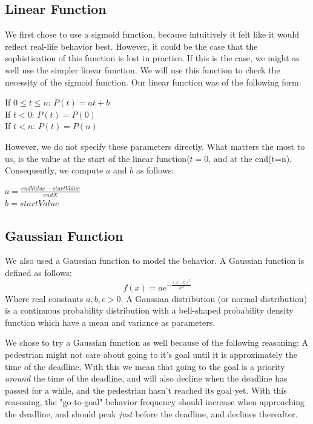 \documentclass[11pt]{book}
\begin{document}
\subsection{Linear Function}
We first chose to use a sigmoid function, because intuitively it felt like it would reflect real-life behavior best. However, it could be the case that the sophistication of this function is lost in practice. If this is the case, we might as well use the simpler linear function. We will use this function to check the necessity of the sigmoid function. Our linear function was of the following form:
\begin{center}
If $0 \leq t \leq n$: $P(t) = at + b$\\
If $t<0$: $P(t) = P(0)$\\
If $t<n$: $P(t) = P(n)$
\end{center}
However, we do not specify these parameters directly. What matters the most to us, is the value at the start of the linear function($t=0$, and at the end(t=n). Consequently, we compute $a$ and $b$ as follows:
\begin{center}
$a = \frac{endValue - startValue}{endX}$\\
$b = startValue$
\end{center}



\subsection{Gaussian Function}
We also used a Gaussian function to model the behavior. A Gaussian function is defined as follows:
\begin{equation}f(x) = ae^{- \frac{(x-b)^2}{2c^2}}\end{equation}
Where real constants $a, b, c > 0 $. A Gaussian distribution (or normal distribution) is a continuous probability distribution with a bell-shaped probability density function which have a mean and variance as parameters.



We chose to try a Gaussian function as well because of the following reasoning: A pedestrian might not care about going to it's goal until it is approximately the time of the deadline. With this we mean that going to the goal is a priority \emph{around} the time of the deadline, and will also decline when the deadline has passed for a while, and the pedestrian hasn't reached its goal yet. With this reasoning, the "go-to-goal" behavior frequency should increase when approaching the deadline, and should peak \emph{just} before the deadline, and declines thereafter.
\end{document}
